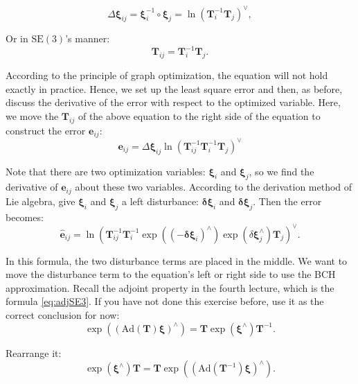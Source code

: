 \begin{equation}
	\Delta \bm{\xi}_{ij} = \bm{\xi}_i^{-1} \circ \bm{\xi}_j = \ln \left( \bm{T}_i^{-1} \bm{T}_j \right)^\vee,
\end{equation}

Or in $\mathrm{SE}(3)$'s manner:
\begin{equation}
	\bm{T}_{ij} =\bm{T}_i^{-1} \bm{T}_j.
\end{equation}

According to the principle of graph optimization, the equation will not hold exactly in practice. Hence, we set up the least square error and then, as before, discuss the derivative of the error with respect to the optimized variable. Here, we move the $\bm{T}_{ij}$ of the above equation to the right side of the equation to construct the error $\bm{e}_{ij}$:
\begin{equation}
	\bm{e}_{ij} = \Delta \bm{\xi}_{ij} \ln \left( \bm{T}_{ij}^{-1} \bm{T}_i^{-1} \bm{T}_j \right)^\vee
\end{equation}

Note that there are two optimization variables: $\bm{\xi}_i$ and $\bm{\xi}_j$, so we find the derivative of $\bm{e}_{ij}$ about these two variables. According to the derivation method of Lie algebra, give $\bm{\xi}_i$ and $\bm{\xi}_j$ a left disturbance: $ \bm{\delta \xi}_i$ and $\bm{\delta \xi}_j$. Then the error becomes:
\begin{equation}
	\hat{ \bm{e}}_{ij} = \ln \left( \bm{T}_{ij}^{-1}  \bm{T}_i^{-1} \exp((-\bm{\delta \xi}_i)^\wedge) \exp(\delta \bm{\xi}_j^\wedge) \bm{T}_j  \right)^\vee.
\end{equation}

In this formula, the two disturbance terms are placed in the middle. We want to move the disturbance term to the equation's left or right side to use the BCH approximation. Recall the adjoint property in the fourth lecture, which is the formula \eqref{eq:adjSE3}. If you have not done this exercise before, use it as the correct conclusion for now:
\begin{equation}
	\exp \left( \left( \mathrm{Ad}(\bm{T}) \bm{\xi} \right) ^\wedge \right) = \bm{T} \exp(\bm{\xi}^\wedge)\bm{T}^{-1}.
\end{equation}

Rearrange it:
\begin{equation}
	\exp(\bm{\xi}^\wedge)\bm{T} = \bm{T} \exp \left( \left( \mathrm{Ad}(\bm{T}^{-1}) \bm{\xi} \right) ^\wedge \right) .
\end{equation}

